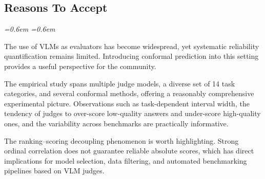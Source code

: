 \documentclass[10pt]{article}
\newenvironment{reviewerquote}{%
  \par\addvspace{0.25ex}\begingroup
  \footnotesize\itshape
  \leftskip=0.6em \rightskip=0.6em
  \color{black!78}
  \setlength{\parskip}{0.35ex plus 0.1ex}
}{%
  \endgroup\par\addvspace{0.25ex}
}
\begin{document}
\subsection*{Reasons To Accept}
\begin{reviewerquote}
The use of VLMs as evaluators has become widespread, yet systematic reliability quantification remains limited. Introducing conformal prediction into this setting provides a useful perspective for the community.

The empirical study spans multiple judge models, a diverse set of 14 task categories, and several conformal methods, offering a reasonably comprehensive experimental picture. Observations such as task-dependent interval width, the tendency of judges to over-score low-quality answers and under-score high-quality ones, and the variability across benchmarks are practically informative.

The ranking--scoring decoupling phenomenon is worth highlighting. Strong ordinal correlation does not guarantee reliable absolute scores, which has direct implications for model selection, data filtering, and automated benchmarking pipelines based on VLM judges.
\end{reviewerquote}
\end{document}
